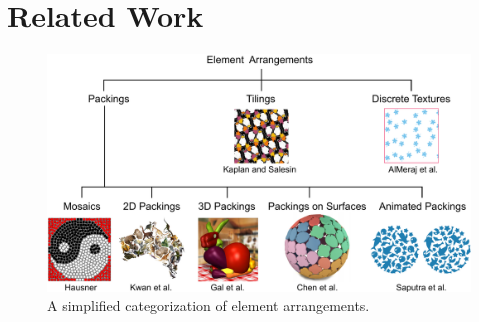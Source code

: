 
\chapter{Related Work}
\label{chapter_related_work}

\begin{figure}[t]
\centering
\includegraphics[width=1.0\textwidth]{figures/related/taxonomy.pdf} 
\caption[A categorization of element arrangements]
{\label{fig_taxonomy} 
\newtext
{
A simplified categorization of element arrangements.
}
}
\end{figure}


